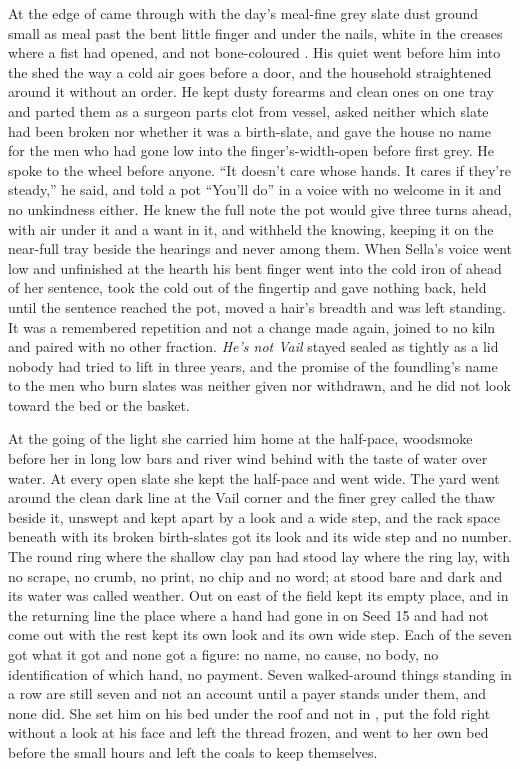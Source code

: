 At the edge of   came through with the day's meal-fine grey slate dust ground small as meal past the bent little finger and under the nails, white in the creases where a fist had opened, and not bone-coloured . His quiet went before him into the shed the way a cold air goes before a door, and the household straightened around it without an order. He kept dusty forearms and clean ones on one tray and parted them as a surgeon parts clot from vessel, asked neither which slate had been broken nor whether it was a birth-slate, and gave the house no name for the men who had gone low into the finger's-width-open  before first grey. He spoke to the wheel before anyone. “It doesn't care whose hands. It cares if they're steady,” he said, and told a pot “You'll do” in a voice with no welcome in it and no unkindness either. He knew the full note the pot would give three turns ahead, with air under it and a want in it, and withheld the knowing, keeping it on the near-full tray beside the hearings and never among them. When Sella's voice went low and unfinished at the hearth his bent finger went into the cold iron of  ahead of her sentence, took the cold out of the fingertip and gave nothing back, held until the sentence reached the pot, moved a hair's breadth and was left standing. It was a remembered repetition and not a change made again, joined to no kiln and paired with no other fraction. \emph{He's not Vail} stayed sealed as tightly as a lid nobody had tried to lift in three years, and the promise of the foundling's name to the men who burn slates was neither given nor withdrawn, and he did not look toward the bed or the basket.

\scenebreak

At the going of the light she carried him home at the half-pace, woodsmoke before her in long low bars and river wind behind with the taste of water over water. At every open slate she kept the half-pace and went wide. The yard went around the clean dark line at the Vail corner and the finer grey called the thaw beside it, unswept and kept apart by a look and a wide step, and the rack space beneath  with its broken birth-slates got its look and its wide step and no number. The round ring where the shallow clay pan had stood lay where the ring lay, with no scrape, no crumb, no print, no chip and no word; at   stood bare and dark and its water was called weather. Out on  east of  the field kept its empty place, and in the returning line the place where a hand had gone in on Seed 15 and had not come out with the rest kept its own look and its own wide step. Each of the seven got what it got and none got a figure: no name, no cause, no body, no identification of which hand, no payment. Seven walked-around things standing in a row are still seven and not an account until a payer stands under them, and none did. She set him on his bed under the roof and not in , put the fold right without a look at his face and left the thread frozen, and went to her own bed before the small hours and left the coals to keep themselves.

